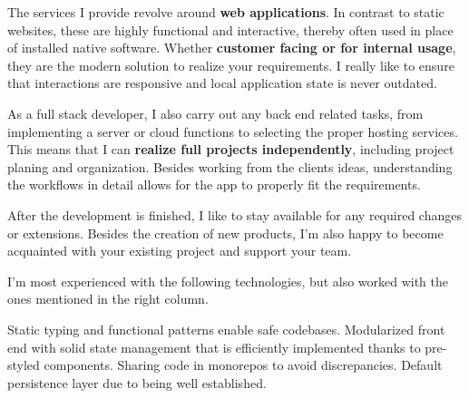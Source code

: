 \begin{paracol}{2}



\medskip


The services I provide revolve around \textbf{web applications}.
In contrast to static websites, these are highly functional and interactive,
thereby often used in place of installed native software.
Whether \textbf{customer facing or for internal usage},
they are the modern solution to realize your requirements.
I really like to ensure that interactions are responsive
and local application state is never outdated.

\smallskip

As a full stack developer, I also carry out any back end related tasks,
from implementing a server or cloud functions to selecting the proper hosting services.
This means that I can \textbf{realize full projects independently},
including project planing and organization.
Besides working from the clients ideas,
understanding the workflows in detail allows for the app to properly fit the requirements.

\smallskip

After the development is finished, I like to stay available for any required changes or extensions.
Besides the creation of new products,
I'm also happy to become acquainted with your existing project and support your team.

\medskip


I'm most experienced with the following technologies,
but also worked with the ones mentioned in the right column.

\medskip

%
    {Static typing and functional patterns enable safe codebases.}
\smallskip
{}%
    {Modularized front end with solid state management
    that is efficiently implemented thanks to pre-styled components.}
\smallskip
{}%
    {Sharing code in monorepos to avoid discrepancies.}
\smallskip
{}%
    {Default persistence layer due to being well established.}


\end{paracol}
